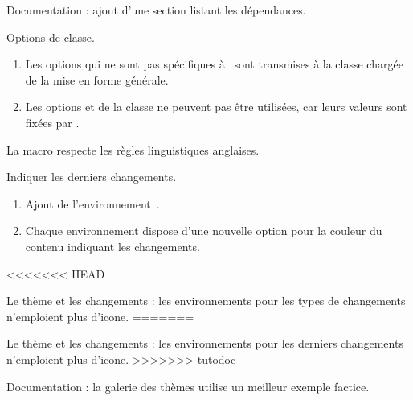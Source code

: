 \begin{tdocnew}
	\item Documentation : ajout d'une section listant les dépendances.

	\item Options de classe.
	\begin{enumerate}
		\item Les options qui ne sont pas spécifiques à \thisproj\ sont transmises à la classe chargée de la mise en forme générale.

		\item Les options  et  de la classe  ne peuvent pas être utilisées, car leurs valeurs sont fixées par \thisproj.
	\end{enumerate}

	\item La macro  respecte les règles linguistiques anglaises.

	\item Indiquer les derniers changements.
	\begin{enumerate}
		\item Ajout de l'environnement \,.

		\item Chaque environnement dispose d'une nouvelle option  pour la couleur du contenu indiquant les changements.
	\end{enumerate}
\end{tdocnew}


\begin{tdocupdate}
<<<<<<< HEAD
	\item Le thème  et les changements : les environnements pour les types de changements n'emploient plus d'icone.
=======
	\item Le thème  et les changements : les environnements pour les derniers changements n'emploient plus d'icone.
>>>>>>> tutodoc

	\item Documentation : la galerie des thèmes utilise un meilleur exemple factice.
\end{tdocupdate}



